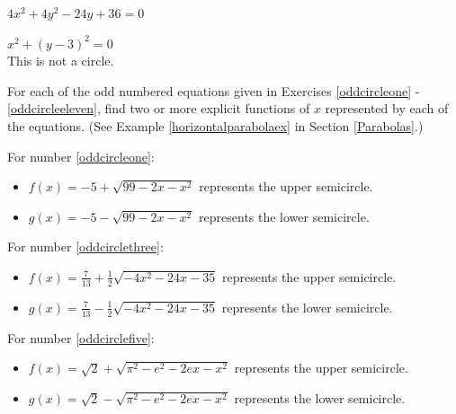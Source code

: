 \documentclass{ximera}
\begin{document}
\begin{question}
\begin{problem}\label{ctscirclelast}
$4x^{2} + 4y^{2} - 24y + 36 = 0$ 

\begin{solution}
    $x^{2} + (y - 3)^{2} = 0$\\
This is not a circle.
\end{solution}
\end{problem} 
\end{question}

\begin{problem}
For each of the odd numbered equations given in Exercises \ref{oddcircleone} - \ref{oddcircleeleven}, find two or more explicit functions of $x$ represented by each of the equations.  (See Example \ref{horizontalparabolaex} in Section \ref{Parabolas}.) 

\begin{solution}
For number \ref{oddcircleone}:

\begin{itemize}

\item  $f(x) = -5 + \sqrt{99-2x-x^2}$ represents the upper semicircle.

\item  $g(x) = -5 - \sqrt{99-2x-x^2}$ represents the lower semicircle.

\end{itemize}

For number \ref{oddcirclethree}:

\begin{itemize}

\item  $f(x) = \frac{7}{13} + \frac{1}{2} \sqrt{-4x^2-24x-35}$ represents the upper semicircle.

\item  $g(x) = \frac{7}{13} - \frac{1}{2} \sqrt{-4x^2-24x-35}$ represents the lower semicircle.

\end{itemize}

For number \ref{oddcirclefive}:

\begin{itemize}

\item  $f(x) = \sqrt{2} + \sqrt{\pi^2-e^2-2ex-x^2}$ represents the upper semicircle.

\item  $g(x) = \sqrt{2} - \sqrt{\pi^2-e^2-2ex-x^2}$  represents the lower semicircle.


\end{itemize}
\end{solution}
\end{problem}
\end{document}
